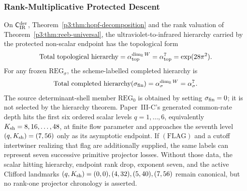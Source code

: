 \documentclass[12pt,a4paper]{article}
\begin{document}
\subsubsection{Rank-Multiplicative Protected Descent}

\begin{theorem}\label{p3:thm:sequential}
On \(\mathsf C_{\rm IR}^{\rm der}\), Theorem~\ref{p3:thm:hopf-decomposition}
and the rank valuation of
Theorem~\ref{p3:thm:reeb-universal}, the ultraviolet-to-infrared hierarchy
carried by the protected non-scalar endpoint has the topological form
\begin{equation}
\text{Total topological hierarchy}
=
\alpha_{\rm top}^{\dim_{\mathbb{R}}W}
=
\alpha_{\rm top}^7
=
\exp(28\pi^2).
\end{equation}
For any frozen \(\mathrm{REG}_\sigma\), the scheme-labelled completed
hierarchy is
\begin{equation}
\text{Total completed hierarchy}(\sigma_{\rm fin})
=
\alpha_\sigma^{\dim_{\mathbb{R}}W}
=
\alpha_\sigma^7.
\end{equation}
The source determinant-shell member \(\mathrm{REG}_0\) is obtained by setting
\(\sigma_{\rm fin}=0\); it is not selected by the hierarchy theorem.
Paper~III-C's generated common-rate depth hits the first six ordered scalar
levels \(q=1,\ldots,6\), equivalently
\(K_{\mathrm{sh}}=8,16,\ldots,48\), at finite flow parameter and approaches the seventh
level \((q,K_{\mathrm{sh}})=(7,56)\) only as its asymptotic endpoint.  If
\((\mathrm{FLAG})\) and a cutoff intertwiner realizing that flag are
additionally supplied, the same labels can represent seven successive
primitive projector losses.  Without those data, the scalar hitting
hierarchy, endpoint rank drop, exponent seven, and the active Clifford
landmarks \((q,K_{\mathrm{sh}})=(0,0),(4,32),(5,40),(7,56)\) remain canonical, but no
rank-one projector chronology is asserted.
\end{theorem}
\end{document}
